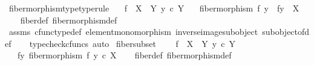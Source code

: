 \begin{isabellebody}
\isanewline
{}\isamarkupfalse%
\ fiber{\isacharunderscore}{\kern0pt}morphism{\isacharunderscore}{\kern0pt}type{\isacharbrackleft}{\kern0pt}type{\isacharunderscore}{\kern0pt}rule{\isacharbrackright}{\kern0pt}{\isacharcolon}{\kern0pt}\isanewline
\ \ \ {\isachardoublequoteopen}f\ {\isacharcolon}{\kern0pt}\ X\ {\isasymrightarrow}\ Y{\isachardoublequoteclose}\ {\isachardoublequoteopen}y\ {\isasymin}\isactrlsub c\ Y{\isachardoublequoteclose}\isanewline
\ \ \ {\isachardoublequoteopen}fiber{\isacharunderscore}{\kern0pt}morphism\ f\ y\ {\isacharcolon}{\kern0pt}\ f\isactrlsup {\isacharminus}{\kern0pt}y{\isacharbraceright}{\kern0pt}\ {\isasymrightarrow}\ X{\isachardoublequoteclose}\isanewline
%
\isadelimproof
\ \ %
\endisadelimproof
%
\isatagproof
{}\isamarkupfalse%
\ fiber{\isacharunderscore}{\kern0pt}def\ fiber{\isacharunderscore}{\kern0pt}morphism{\isacharunderscore}{\kern0pt}def\isanewline
\ \ \isamarkupfalse%
\ assms\ cfunc{\isacharunderscore}{\kern0pt}type{\isacharunderscore}{\kern0pt}def\ element{\isacharunderscore}{\kern0pt}monomorphism\ inverse{\isacharunderscore}{\kern0pt}image{\isacharunderscore}{\kern0pt}subobject\ subobject{\isacharunderscore}{\kern0pt}of{\isacharunderscore}{\kern0pt}def{}\isanewline
\ \ \isamarkupfalse%
\ {\isacharparenleft}{\kern0pt}typecheck{\isacharunderscore}{\kern0pt}cfuncs{\isacharcomma}{\kern0pt}\ auto{\isacharparenright}{\kern0pt}%
\endisatagproof
{\isafoldproof}%
%
\isadelimproof
\isanewline
%
\endisadelimproof
\isanewline
{}\isamarkupfalse%
\ fiber{\isacharunderscore}{\kern0pt}subset{\isacharcolon}{\kern0pt}\ \isanewline
\ \ \ {\isachardoublequoteopen}f\ {\isacharcolon}{\kern0pt}\ X\ {\isasymrightarrow}\ Y{\isachardoublequoteclose}\ {\isachardoublequoteopen}y\ {\isasymin}\isactrlsub c\ Y{\isachardoublequoteclose}\isanewline
\ \ \ {\isachardoublequoteopen}{\isacharparenleft}{\kern0pt}f\isactrlsup {\isacharminus}{\kern0pt}y{\isacharbraceright}{\kern0pt}{\isacharcomma}{\kern0pt}\ fiber{\isacharunderscore}{\kern0pt}morphism\ f\ y{\isacharparenright}{\kern0pt}\ {\isasymsubseteq}\isactrlsub c\ X{\isachardoublequoteclose}\isanewline
%
\isadelimproof
\ \ %
\endisadelimproof
%
\isatagproof
{}\isamarkupfalse%
\ fiber{\isacharunderscore}{\kern0pt}def\ fiber{\isacharunderscore}{\kern0pt}morphism{\isacharunderscore}{\kern0pt}def\isanewline

\end{isabellebody}
